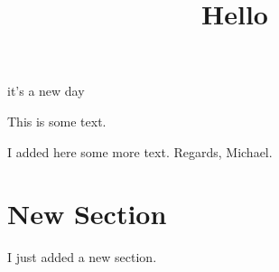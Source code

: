 \documentclass{article}
\title{Hello}
\begin{document}
\maketitle

it's a new day
	
This is some text.

I added here some more text.
Regards, Michael.

\section{New Section}

I just added a new section.
\end{document}
